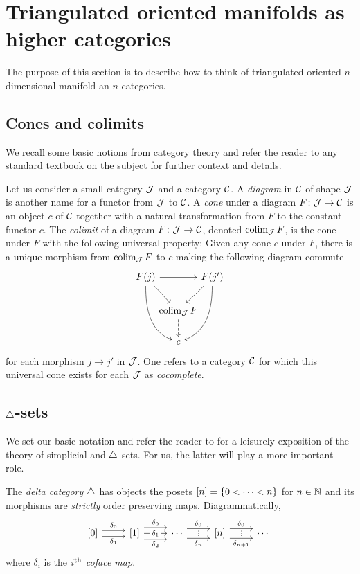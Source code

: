 
\section{Triangulated oriented manifolds as higher categories}

The purpose of this section is to describe how to think of triangulated oriented $n$-dimensional manifold an $n$-categories.

\subsection{Cones and colimits}

We recall some basic notions from category theory and refer the reader to any standard textbook on the subject for further context and details.

Let us consider a small category $\mathcal{J}$ and a category $\mathcal{C}$.
A \textit{diagram} in $\mathcal{C}$ of shape $\mathcal{J}$ is another name for a functor from $\mathcal{J}$ to $\mathcal{C}$.
A \textit{cone} under a diagram $F \colon \mathcal{J} \to \mathcal{C}$ is an object $c$ of $\mathcal{C}$ together with a natural transformation from $F$ to the constant functor $c$.
The \textit{colimit} of a diagram $F \colon \mathcal{J} \to \mathcal{C}$, denoted $\operatorname*{colim}_{\mathcal{J}} F$, is the cone under $F$ with the following universal property: Given any cone $c$ under $F$, there is a unique morphism from $\operatorname*{colim}_{\mathcal{J}} F$ to $c$ making the following diagram commute
\[
\begin{tikzcd}[column sep=-5pt]
	F(j) \arrow[rr] \arrow[dr,in=135, out=-45] \arrow[ddr,in=160,out=-90] & &
	F(j') \arrow[dl,in=45, out=-135] \arrow[ddl,in=20,out=-90] \\
	& \colim_\cJ F \arrow[dashed,d]& \\
	& c &
\end{tikzcd}
\]
for each morphism $j \to j'$ in $\mathcal{J}$.
One refers to a category $\mathcal{C}$ for which this universal cone exists for each $\mathcal{J}$ as \textit{cocomplete}.

\subsection{$\triangle$-sets}

We set our basic notation and refer the reader to \cite{friedman2021simplicial} for a leisurely exposition of the theory of simplicial and $\triangle$-sets.
For us, the latter will play a more important role.

The \textit{delta category} $\triangle$ has objects the posets $[n] = \{0 < \dots < n\}$ for $n \in \mathbb{N}$ and its morphisms are \textit{strictly} order preserving maps.
Diagrammatically,
\[
\begin{tikzcd}
	{[0]} \arrow[r,shift left=3pt, "\delta_0"] \arrow[r,shift right=3pt, "\delta_1"'] &
	{[1]} \arrow[r,shift left=6pt, "\delta_0"] \arrow[r, "\delta_1"' description] \arrow[r,shift right=6pt, "\delta_2"'] &
	\dotsb
	\arrow[r,shift left=5pt, "\delta_0"] \arrow[r,shift right=5pt, "\delta_n"', "\scalebox{0.6}{$\vdots$}"] &
	{[n]}
	\arrow[r,shift left=5pt, "\delta_0"] \arrow[r,shift right=5pt, "\delta_{n+1}"', "\scalebox{0.6}{$\vdots$}"] &
	\dotsb \
\end{tikzcd}
\]
where $\delta_i$ is the $i^{\mathrm{th}}$ \textit{coface map}.


